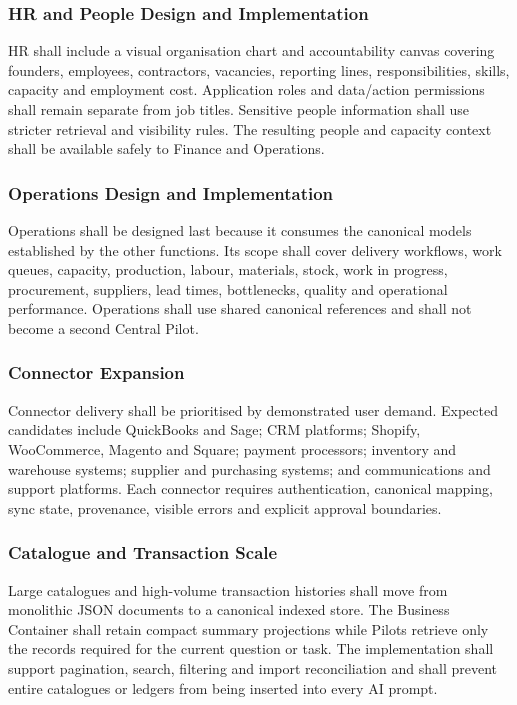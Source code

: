 \subsubsection{HR and People Design and Implementation}

HR shall include a visual organisation chart and accountability canvas covering founders,
employees, contractors, vacancies, reporting lines, responsibilities, skills, capacity and
employment cost.  Application roles and data/action permissions shall remain separate from
job titles.  Sensitive people information shall use stricter retrieval and visibility rules.
The resulting people and capacity context shall be available safely to Finance and Operations.

\subsubsection{Operations Design and Implementation}

Operations shall be designed last because it consumes the canonical models established by
the other functions.  Its scope shall cover delivery workflows, work queues, capacity,
production, labour, materials, stock, work in progress, procurement, suppliers, lead times,
bottlenecks, quality and operational performance.  Operations shall use shared canonical
references and shall not become a second Central Pilot.

\subsubsection{Connector Expansion}

Connector delivery shall be prioritised by demonstrated user demand.  Expected candidates
include QuickBooks and Sage; CRM platforms; Shopify, WooCommerce, Magento and Square;
payment processors; inventory and warehouse systems; supplier and purchasing systems; and
communications and support platforms.  Each connector requires authentication, canonical
mapping, sync state, provenance, visible errors and explicit approval boundaries.

\subsubsection{Catalogue and Transaction Scale}

Large catalogues and high-volume transaction histories shall move from monolithic JSON
documents to a canonical indexed store.  The Business Container shall retain compact summary
projections while Pilots retrieve only the records required for the current question or task.
The implementation shall support pagination, search, filtering and import reconciliation and
shall prevent entire catalogues or ledgers from being inserted into every AI prompt.

